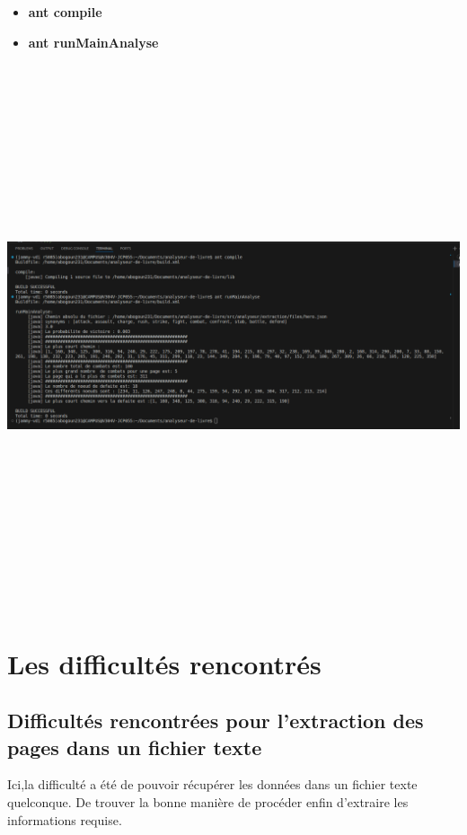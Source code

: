 \documentclass[12pt]{article}
\begin{document}
\begin{itemize}
 \item \textbf{ant compile}
 \item \textbf{ant runMainAnalyse}
 
\end{itemize}
\includegraphics[width=16cm,height=16cm]{images/MainAnalyse.png}

\section{Les difficultés rencontrés}
\subsection{Difficultés rencontrées pour l'extraction des pages dans un fichier texte}
Ici,la difficulté a été de pouvoir récupérer les données dans un fichier texte quelconque. De trouver la bonne manière de procéder enfin d'extraire les informations requise.
\end{document}
